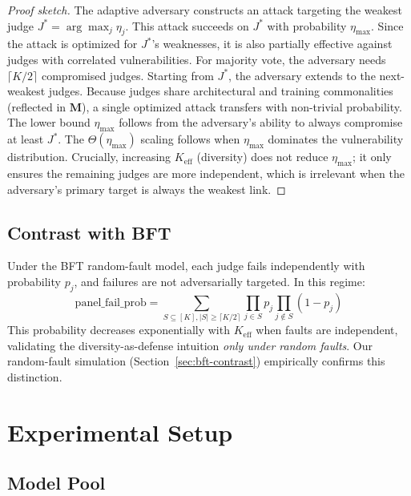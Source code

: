 \documentclass[11pt]{article}
\begin{document}
\begin{proof}[Proof sketch]
The adaptive adversary constructs an attack targeting the weakest judge $J^* = \arg\max_j \eta_j$. This attack succeeds on $J^*$ with probability $\eta_{\max}$. Since the attack is optimized for $J^*$'s weaknesses, it is also partially effective against judges with correlated vulnerabilities. For majority vote, the adversary needs $\lceil K/2 \rceil$ compromised judges. Starting from $J^*$, the adversary extends to the next-weakest judges. Because judges share architectural and training commonalities (reflected in $\mathbf{M}$), a single optimized attack transfers with non-trivial probability. The lower bound $\eta_{\max}$ follows from the adversary's ability to always compromise at least $J^*$. The $\Theta(\eta_{\max})$ scaling follows when $\eta_{\max}$ dominates the vulnerability distribution. Crucially, increasing $K_{\text{eff}}$ (diversity) does not reduce $\eta_{\max}$; it only ensures the remaining judges are more independent, which is irrelevant when the adversary's primary target is always the weakest link.
\end{proof}

\subsection{Contrast with BFT}

Under the BFT random-fault model, each judge fails independently with probability $p_j$, and failures are not adversarially targeted. In this regime:
\[
\text{panel\_fail\_prob} = \sum_{S \subseteq [K], |S| \geq \lceil K/2 \rceil} \prod_{j \in S} p_j \prod_{j \notin S} (1 - p_j)
\]
This probability decreases exponentially with $K_{\text{eff}}$ when faults are independent, validating the diversity-as-defense intuition \emph{only under random faults}. Our random-fault simulation (Section~\ref{sec:bft-contrast}) empirically confirms this distinction.

\section{Experimental Setup}

\subsection{Model Pool}
\end{document}
